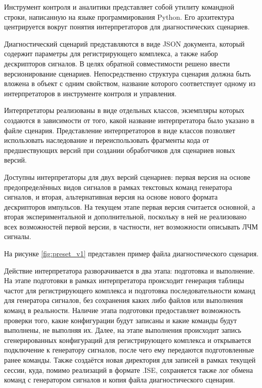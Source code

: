 \documentclass{report}
\begin{document}
Инструмент контроля и аналитики представляет собой утилиту командной строки, написанную на языке программирования Python. Его архитектура центрируется вокруг понятия интерпретаторов для диагностических сценариев.

Диагностический сценарий представляются в виде JSON документа, который содержит параметры для регистрирующего комплекса, а также набор дескрипторов сигналов. В целях обратной совместимости решено ввести версионирование сценариев. Непосредственно структура сценария должна быть вложена в объект с одним свойством, название которого соответствует одному из интерпретаторов в инструменте контроля и управления.

Интерпретаторы реализованы в виде отдельных классов, экземпляры которых создаются в зависимости от того, какой название интерпретатора было указано в файле сценария. Представление интерпретаторов в виде классов позволяет использовать наследование и переиспользовать фрагменты кода от предшествующих версий при создании обработчиков для сценариев новых версий.

Доступны интерпретаторы для двух версий сценариев: первая версия на основе предопределённых видов сигналов в рамках текстовых команд генератора сигналов, и вторая, альтернативная версия на основе нового формата дескрипторов импульсов. На текущем этапе первая версия считается основной, а вторая экспериментальной и дополнительной, поскольку в ней не реализовано всех возможностей первой версии, в частности, нет возможности описывать ЛЧМ сигналы.

На рисунке \ref{fig:preset_v1} представлен пример файла диагностического сценария.


Действие интерпретатора разворачивается в два этапа: подготовка и выполнение. На этапе подготовки в рамках интерпретатора происходит генерация таблицы частот для регистрирующего комплекса и подготовка последовательности команд для генератора сигналов, без сохранения каких либо файлов или выполнения команд в реальности. Наличие этапа подготовки предоставляет возможность проверки того, какие конфигурации будут записаны и какие команды будут выполнены, не выполняя их. Далее, на этапе выполнения происходит запись сгенерированных конфигураций для регистрирующего комплекса и открывается подключение к генератору сигналов, после чего ему передаются подготовленные ранее команды. Также создаётся новая директория для записей в рамках текущей сессии, куда, помимо реализаций в формате .ISE, сохраняется также лог обмена команд с генератором сигналов и копия файла диагностического сценария.
\end{document}
